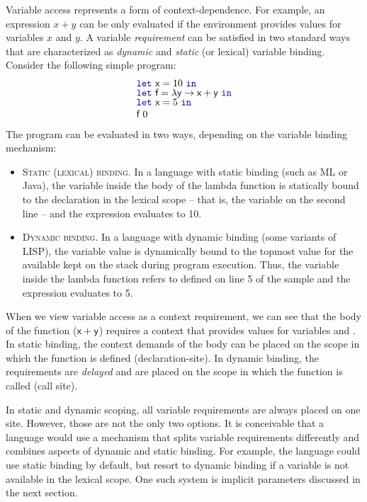 Variable access represents a form of context-dependence. For example, an expression $x+y$ can be
only evaluated if the environment provides values for variables $x$ and $y$. A variable
\emph{requirement} can be satisfied in two standard ways that are characterized as \emph{dynamic}
and \emph{static} (or lexical) variable binding. Consider the following simple program:
%
\begin{equation*}
\begin{array}{l}
\kvd{let}~\ident{x}=10~\kvd{in}\\[-0.25em]
\kvd{let}~\ident{f}=\lambda \ident{y}\rightarrow \ident{x}+\ident{y}~\kvd{in}\\[-0.25em]
\kvd{let}~\ident{x}=5~\kvd{in}\\
\ident{f}~0
\end{array}
\end{equation*}
%
The program can be evaluated in two ways, depending on the variable binding mechanism:
%
\begin{itemize}
\item \textsc{Static (lexical) binding.} In a language with static binding (such as ML or Java),
  the variable  inside the body of the lambda function is statically bound to the
  declaration in the lexical scope -- that is, the variable on the second line -- and the
  expression evaluates to 10.

\item \textsc{Dynamic binding.} In a language with dynamic binding (some variants of LISP), the
  variable value is dynamically bound to the topmost value for the available kept on the stack 
  during program execution. Thus, the  variable inside the lambda function refers to
   defined on line 5 of the sample and the expression evaluates to 5.
\end{itemize}

\noindent
When we view variable access as a context requirement, we can see that the body of the function
($\ident{x}+\ident{y}$) requires a context that provides values for variables  and
. In static binding, the context demands of the body can be placed on the scope in
which the function is defined (declaration-site). In dynamic binding, the requirements are
\emph{delayed} and are placed on the scope in which the function is called (call site).

In static and dynamic scoping, all variable requirements are always placed on one site. However,
those are not the only two options. It is conceivable that a language would use a mechanism that
splits variable requirements differently and combines aspects of dynamic and static binding. For
example, the language could use static binding by default, but resort to dynamic binding if a
variable is not available in the lexical scope. One such system is implicit parameters
discussed in the next section.

